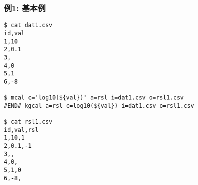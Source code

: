 
\subsubsection*{例1: 基本例}


\begin{Verbatim}[baselinestretch=0.7,frame=single]
$ cat dat1.csv
id,val
1,10
2,0.1
3,
4,0
5,1
6,-8

$ mcal c='log10(${val})' a=rsl i=dat1.csv o=rsl1.csv
#END# kgcal a=rsl c=log10(${val}) i=dat1.csv o=rsl1.csv

$ cat rsl1.csv
id,val,rsl
1,10,1
2,0.1,-1
3,,
4,0,
5,1,0
6,-8,
\end{Verbatim}
